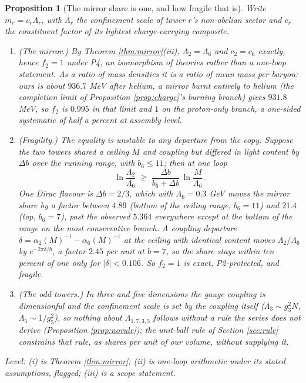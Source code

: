 \documentclass[11pt]{article}
\newtheorem{proposition}[theorem]{Proposition}
\theoremstyle{definition}
\begin{document}
\begin{proposition}[The mirror share is one, and how fragile that is]\label{prop:massbound}
Write $m_{r} = c_{r}\Lambda_{r}$, with $\Lambda_{r}$ the confinement scale of tower $r$'s non-abelian sector and $c_{r}$ the constituent factor of its lightest charge-carrying composite.
\begin{enumerate}
\item[(i)] \emph{(The mirror.)} By Theorem \ref{thm:mirror}(iii), $\Lambda_{2} = \Lambda_{6}$ and $c_{2} = c_{6}$ exactly, hence $f_{2} = 1$ under P4, an isomorphism of theories rather than a one-loop statement. As a ratio of mass densities it is a ratio of mean mass per baryon: ours is about $936.7$ MeV after helium, a mirror burnt entirely to helium (the completion limit of Proposition \ref{prop:charge}'s burning branch) gives $931.8$ MeV, so $f_{2}$ is $0.995$ in that limit and $1$ on the proton-only branch, a one-sided systematic of half a percent at assembly level.
\item[(ii)] \emph{(Fragility.)} The equality is unstable to any departure from the copy. Suppose the two towers shared a ceiling $M$ and coupling but differed in light content by $\Delta b$ over the running range, with $b_{6} \leq 11$; then at one loop
\[
\ln\frac{\Lambda_{2}}{\Lambda_{6}} \;\geq\; \frac{\Delta b}{b_{6} + \Delta b}\,\ln\frac{M}{\Lambda_{6}}.
\]
One Dirac flavour is $\Delta b = 2/3$, which with $\Lambda_{6} = 0.3$ GeV moves the mirror share by a factor between $4.89$ (bottom of the ceiling range, $b_{6} = 11$) and $21.4$ (top, $b_{6} = 7$), past the observed $5.364$ everywhere except at the bottom of the range on the most conservative branch. A coupling departure $\delta = \alpha_{2}(M)^{-1} - \alpha_{6}(M)^{-1}$ at the ceiling with identical content moves $\Lambda_{2}/\Lambda_{6}$ by $e^{-2\pi\delta/b}$, a factor $2.45$ per unit at $b = 7$, so the share stays within ten percent of one only for $|\delta| < 0.106$. So $f_{2} = 1$ is exact, P2-protected, and fragile.
\item[(iii)] \emph{(The odd towers.)} In three and five dimensions the gauge coupling is dimensionful and the confinement scale is set by the coupling itself ($\Lambda_{3} \sim g_{3}^{2}N$, $\Lambda_{5} \sim 1/g_{5}^{2}$), so nothing about $\Lambda_{1,7,3,5}$ follows without a rule the series does not derive (Proposition \ref{prop:norule}); the unit-ball rule of Section \ref{sec:rule} constrains that rule, as shares per unit of our volume, without supplying it.
\end{enumerate}
Level: (i) is Theorem \ref{thm:mirror}; (ii) is one-loop arithmetic under its stated assumptions, flagged; (iii) is a scope statement.
\end{proposition}
\end{document}
